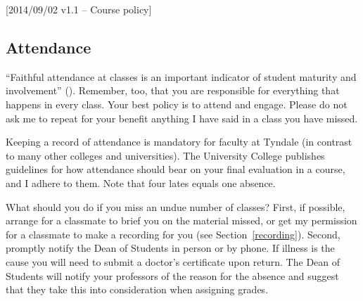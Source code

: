 [2014/09/02 v1.1 -- Course policy]

\subsection{Attendance}
\label{attendance}

``Faithful attendance at classes is an important indicator of student maturity
and involvement'' (\AC). Remember, too, that you are responsible for everything
that happens in every class. Your best policy is to attend and engage. Please
do not ask me to repeat for your benefit anything I have said in a class you
have missed.

Keeping a record of attendance is mandatory for faculty at Tyndale (in contrast
to many other colleges and universities). The University College publishes
guidelines for how attendance should bear on your final evaluation in a course,
and I adhere to them. Note that four lates equals one absence.

What should you do if you miss an undue number of classes? First, if possible,
arrange for a classmate to brief you on the material missed, or get my
permission for a classmate to make a recording for you (see
Section~\ref{recording}). Second, promptly notify the Dean of Students in
person or by phone. If illness is the cause you will need to submit a doctor's
certificate upon return. The Dean of Students will notify your professors of
the reason for the absence and suggest that they take this into consideration
when assigning grades.
